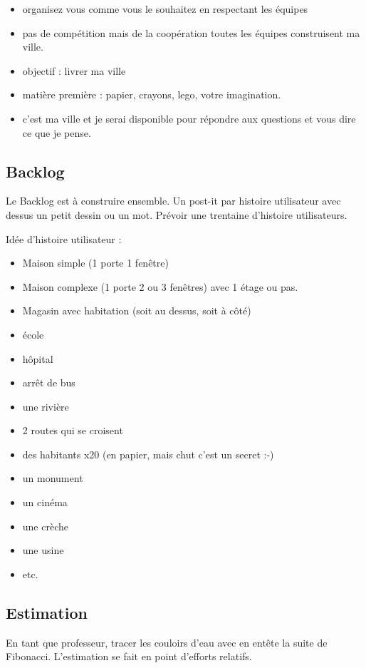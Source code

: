 \documentclass[a4paper,12pt]{article}
\begin{document}
\begin{itemize}
  \item organisez vous comme vous le souhaitez en respectant les équipes
  \item pas de compétition mais de la coopération toutes les équipes construisent ma ville.
  \item objectif : livrer ma ville
  \item matière première : papier, crayons, lego, votre imagination.
  \item c'est ma ville et je serai disponible pour répondre aux questions et vous dire ce que je pense.
\end{itemize}

\subsection{Backlog}
Le Backlog est à construire ensemble. Un post-it par histoire utilisateur avec dessus un petit dessin ou un mot. Prévoir une trentaine d'histoire utilisateurs.

Idée d'histoire utilisateur :
\begin{itemize}
  \item Maison simple (1 porte 1 fenêtre)
  \item Maison complexe (1 porte 2 ou 3 fenêtres) avec 1 étage ou pas.
  \item Magasin avec habitation (soit au dessus, soit à côté)
  \item école
  \item hôpital
  \item arrêt de bus
  \item une rivière
  \item 2 routes qui se croisent
  \item des habitants x20 (en papier, mais chut c'est un secret :-)
  \item un monument
  \item un cinéma
  \item une crèche
  \item une usine
  \item etc.
\end{itemize}

\subsection{Estimation}
En tant que professeur, tracer les couloirs d'eau avec en entête la suite de Fibonacci.
L'estimation se fait en point d'efforts relatifs.
\end{document}
